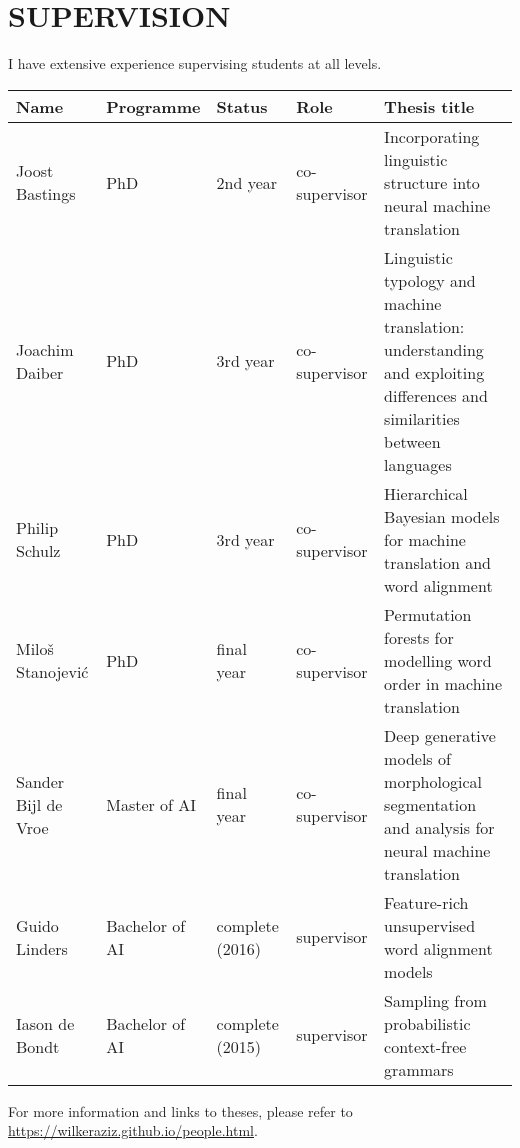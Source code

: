 \section*{SUPERVISION}

I have extensive experience supervising students at all levels. 

\begin{tabular}{l l p{2cm} l p{6cm}}
\bf Name & \bf Programme & \bf Status & \bf Role & \bf Thesis title \\ \hline
Joost Bastings & PhD & 2nd year & co-supervisor & Incorporating linguistic structure into neural machine translation \\
Joachim Daiber & PhD & 3rd year & co-supervisor & Linguistic typology and machine translation: understanding and exploiting differences and similarities between languages\\
Philip Schulz  & PhD & 3rd year & co-supervisor & Hierarchical Bayesian models for machine translation and word alignment \\
Milo\v{s} Stanojevi\'c & PhD & final year & co-supervisor & Permutation forests for modelling word order in machine translation \\
Sander Bijl de Vroe & Master of AI & final year & co-supervisor & Deep generative models of morphological segmentation and analysis for neural machine translation\\
Guido Linders & Bachelor of AI & complete (2016) & supervisor & Feature-rich unsupervised word alignment models \\
Iason de Bondt & Bachelor of AI & complete (2015) & supervisor & Sampling from probabilistic context-free grammars\\ \hline
\end{tabular}
For more information and links to theses, please refer to \url{https://wilkeraziz.github.io/people.html}.








